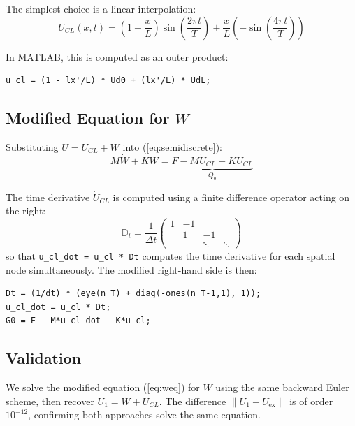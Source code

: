 \documentclass[11pt,a4paper]{article}
\begin{document}
The simplest choice is a linear interpolation:
\begin{equation}
    U_{CL}(x,t) = \left(1 - \frac{x}{L}\right)\sin\!\left(\frac{2\pi t}{T}\right) + \frac{x}{L}\left(-\sin\!\left(\frac{4\pi t}{T}\right)\right)
    \label{eq:ucl}
\end{equation}

In MATLAB, this is computed as an outer product:
\begin{lstlisting}
u_cl = (1 - lx'/L) * Ud0 + (lx'/L) * UdL;
\end{lstlisting}

\subsection{Modified Equation for $W$}

Substituting $U = U_{CL} + W$ into (\ref{eq:semidiscrete}):
\begin{equation}
    M\dot{W} + KW = \underbrace{F - M\dot{U}_{CL} - KU_{CL}}_{Q_0}
    \label{eq:weq}
\end{equation}

The time derivative $\dot{U}_{CL}$ is computed using a finite difference operator acting on the right:
\begin{equation}
    \mathbb{D}_t = \frac{1}{\Delta t}\begin{pmatrix} 1 & -1 & & \\ & 1 & -1 & \\ & & \ddots & \ddots \end{pmatrix}
\end{equation}
so that \texttt{u\_cl\_dot = u\_cl * Dt} computes the time derivative for each spatial node simultaneously. The modified right-hand side is then:
\begin{lstlisting}
Dt = (1/dt) * (eye(n_T) + diag(-ones(n_T-1,1), 1));
u_cl_dot = u_cl * Dt;
G0 = F - M*u_cl_dot - K*u_cl;
\end{lstlisting}

\subsection{Validation}

We solve the modified equation (\ref{eq:weq}) for $W$ using the same backward Euler scheme, then recover $U_1 = W + U_{CL}$. The difference $\|U_1 - U_{\text{ex}}\|$ is of order $10^{-12}$, confirming both approaches solve the same equation.

\end{document}
